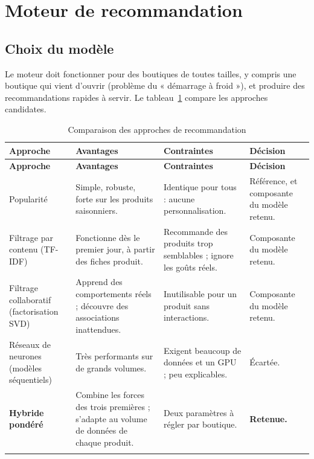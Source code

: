 \section{Moteur de recommandation}
\subsection{Choix du modèle}
Le moteur doit fonctionner pour des boutiques de toutes tailles, y compris une boutique qui vient d'ouvrir (problème du « démarrage à froid »), et produire des recommandations rapides à servir. Le tableau~\ref{tab:comparaison-reco} compare les approches candidates.
\renewcommand{\arraystretch}{1.4}
\begin{longtable}{|p{3.1cm}|p{4.3cm}|p{4.3cm}|p{2.5cm}|}
\hline
\textbf{Approche} & \textbf{Avantages} & \textbf{Contraintes} & \textbf{Décision} \\
\hline
\endfirsthead
\hline
\textbf{Approche} & \textbf{Avantages} & \textbf{Contraintes} & \textbf{Décision} \\
\hline
\endhead
Popularité & Simple, robuste, forte sur les produits saisonniers. & Identique pour tous : aucune personnalisation. & Référence, et composante du modèle retenu. \\
\hline
Filtrage par contenu (TF-IDF) & Fonctionne dès le premier jour, à partir des fiches produit. & Recommande des produits trop semblables ; ignore les goûts réels. & Composante du modèle retenu. \\
\hline
Filtrage collaboratif (factorisation SVD) & Apprend des comportements réels ; découvre des associations inattendues. & Inutilisable pour un produit sans interactions. & Composante du modèle retenu. \\
\hline
Réseaux de neurones (modèles séquentiels) & Très performants sur de grands volumes. & Exigent beaucoup de données et un GPU ; peu explicables. & Écartée. \\
\hline
\textbf{Hybride pondéré} & Combine les forces des trois premières ; s'adapte au volume de données de chaque produit. & Deux paramètres à régler par boutique. & \textbf{Retenue.} \\
\hline
\caption{Comparaison des approches de recommandation}
\label{tab:comparaison-reco}
\end{longtable}

